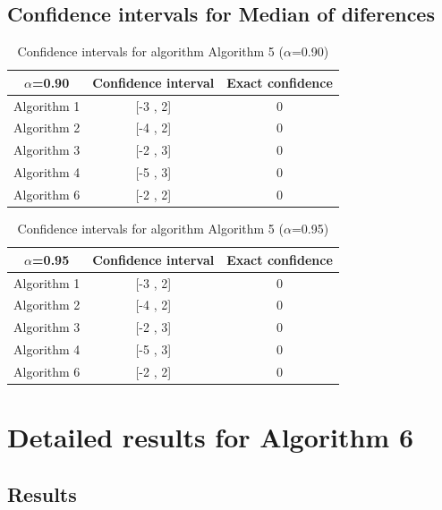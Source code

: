 \documentclass[a4paper,10pt]{article}
\begin{document}
\subsection{Confidence intervals for Median of diferences}

\begin{table}[!htp]
\centering\small
\begin{tabular}{
|c|c|c|}
\hline
 $\alpha$=0.90 & Confidence interval & Exact confidence \\ \hline 
Algorithm 1 & [-3 , 2] & 0\\ \hline 
Algorithm 2 & [-4 , 2] & 0\\ \hline 
Algorithm 3 & [-2 , 3] & 0\\ \hline 
Algorithm 4 & [-5 , 3] & 0\\ \hline 
Algorithm 6 & [-2 , 2] & 0\\ \hline 

\end{tabular}
\caption{Confidence intervals for algorithm Algorithm 5 ($\alpha$=0.90)}
\end{table}
\begin{table}[!htp]
\centering\small
\begin{tabular}{
|c|c|c|}
\hline
 $\alpha$=0.95 & Confidence interval & Exact confidence \\ \hline 
Algorithm 1 & [-3 , 2] & 0\\ \hline 
Algorithm 2 & [-4 , 2] & 0\\ \hline 
Algorithm 3 & [-2 , 3] & 0\\ \hline 
Algorithm 4 & [-5 , 3] & 0\\ \hline 
Algorithm 6 & [-2 , 2] & 0\\ \hline 

\end{tabular}
\caption{Confidence intervals for algorithm Algorithm 5 ($\alpha$=0.95)}
\end{table}

 \clearpage 


\section{Detailed results for Algorithm 6}


\subsection{Results}
\end{document}
